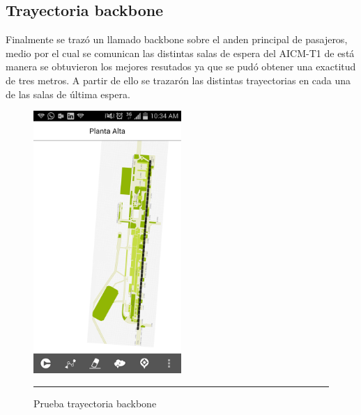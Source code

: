 \subsection{Trayectoria backbone}
Finalmente se trazó un llamado backbone sobre el anden principal de pasajeros, medio por el cual se comunican las distintas salas de espera 
del AICM-T1 de está manera se obtuvieron los mejores resutados ya que se pudó obtener una exactitud de tres metros. A partir de ello 
se trazarón las distintas trayectorias en cada una de las salas de última espera.
\begin{figure}[h]
	\centering
		\includegraphics[width=0.5\textwidth]{Figuras/backbone.png}
		\rule{30em}{0.5pt}
	\caption[Prueba trayectoria backbone]{Prueba trayectoria backbone}
	\label{fig:vistaPruebaBackbone}
\end{figure}
\clearpage

